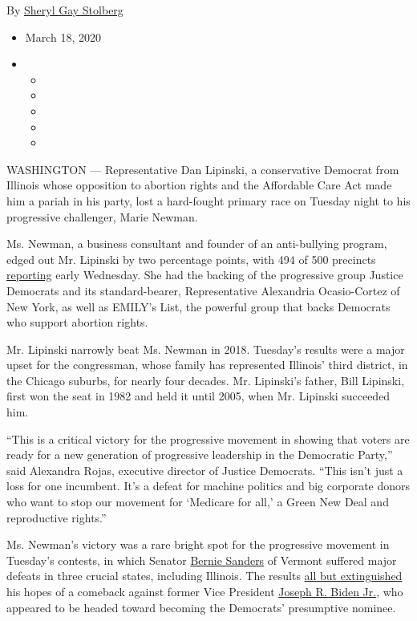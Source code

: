 By \href{https://www.nytimes.com/by/sheryl-gay-stolberg}{Sheryl Gay
Stolberg}

\begin{itemize}
\item
  March 18, 2020
\item
  \begin{itemize}
  \item
  \item
  \item
  \item
  \item
  \end{itemize}
\end{itemize}

WASHINGTON --- Representative Dan Lipinski, a conservative Democrat from
Illinois whose opposition to abortion rights and the Affordable Care Act
made him a pariah in his party, lost a hard-fought primary race on
Tuesday night to his progressive challenger, Marie Newman.

Ms. Newman, a business consultant and founder of an anti-bullying
program, edged out Mr. Lipinski by two percentage points, with 494 of
500 precincts
\href{https://www.nytimes.com/interactive/2020/03/17/us/elections/results-illinois-house-district-3-primary-election.html}{reporting}
early Wednesday. She had the backing of the progressive group Justice
Democrats and its standard-bearer, Representative Alexandria
Ocasio-Cortez of New York, as well as EMILY's List, the powerful group
that backs Democrats who support abortion rights.

Mr. Lipinski narrowly beat Ms. Newman in 2018. Tuesday's results were a
major upset for the congressman, whose family has represented Illinois'
third district, in the Chicago suburbs, for nearly four decades. Mr.
Lipinski's father, Bill Lipinski, first won the seat in 1982 and held it
until 2005, when Mr. Lipinski succeeded him.

``This is a critical victory for the progressive movement in showing
that voters are ready for a new generation of progressive leadership in
the Democratic Party,'' said Alexandra Rojas, executive director of
Justice Democrats. ``This isn't just a loss for one incumbent. It's a
defeat for machine politics and big corporate donors who want to stop
our movement for `Medicare for all,' a Green New Deal and reproductive
rights.''

Ms. Newman's victory was a rare bright spot for the progressive movement
in Tuesday's contests, in which Senator
\href{https://www.nytimes.com/interactive/2020/us/elections/bernie-sanders.html}{Bernie
Sanders} of Vermont suffered major defeats in three crucial states,
including Illinois. The results
\href{https://www.nytimes.com/2020/03/17/us/politics/biden-florida-illinois-primary.html?action=click\&module=ELEX_results\&pgtype=Interactive\&region=ReporterUpdates}{all
but extinguished} his hopes of a comeback against former Vice President
\href{https://www.nytimes.com/interactive/2020/us/elections/joe-biden.html}{Joseph
R. Biden Jr.}, who appeared to be headed toward becoming the Democrats'
presumptive nominee.

